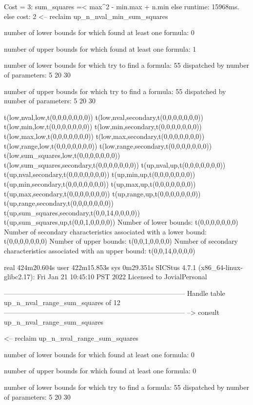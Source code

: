 Cost =  3:  sum_squares =< max^2 - min.max + n.min
else runtime: 15968ms. else cost: 2
<-- reclaim up_n_nval_min_sum_squares

number of lower bounds for which found at least one formula: 0

number of upper bounds for which found at least one formula: 1

number of lower bounds for which try to find a formula: 55
dispatched by number of parameters: 5  20  30

number of upper bounds for which try to find a formula: 55
dispatched by number of parameters: 5  20  30

t(low,nval,low,t(0,0,0,0,0,0,0))
t(low,nval,secondary,t(0,0,0,0,0,0,0))
t(low,min,low,t(0,0,0,0,0,0,0))
t(low,min,secondary,t(0,0,0,0,0,0,0))
t(low,max,low,t(0,0,0,0,0,0,0))
t(low,max,secondary,t(0,0,0,0,0,0,0))
t(low,range,low,t(0,0,0,0,0,0,0))
t(low,range,secondary,t(0,0,0,0,0,0,0))
t(low,sum_squares,low,t(0,0,0,0,0,0,0))
t(low,sum_squares,secondary,t(0,0,0,0,0,0,0))
t(up,nval,up,t(0,0,0,0,0,0,0))
t(up,nval,secondary,t(0,0,0,0,0,0,0))
t(up,min,up,t(0,0,0,0,0,0,0))
t(up,min,secondary,t(0,0,0,0,0,0,0))
t(up,max,up,t(0,0,0,0,0,0,0))
t(up,max,secondary,t(0,0,0,0,0,0,0))
t(up,range,up,t(0,0,0,0,0,0,0))
t(up,range,secondary,t(0,0,0,0,0,0,0))
t(up,sum_squares,secondary,t(0,0,14,0,0,0,0))
t(up,sum_squares,up,t(0,0,1,0,0,0,0))
Number of lower bounds:                                             t(0,0,0,0,0,0,0)
Number of secondary characteristics associated with a lower bound:  t(0,0,0,0,0,0,0)
Number of upper bounds:                                             t(0,0,1,0,0,0,0)
Number of secondary characteristics associated with an upper bound: t(0,0,14,0,0,0,0)

real	424m20.604s
user	422m15.853s
sys	0m29.351s
SICStus 4.7.1 (x86_64-linux-glibc2.17): Fri Jan 21 10:45:10 PST 2022
Licensed to JovialPersonal


--------------------------------------------------------------------------------
Handle table up_n_nval_range_sum_squares of 12
--------------------------------------------------------------------------------
--> consult up_n_nval_range_sum_squares

<-- reclaim up_n_nval_range_sum_squares

number of lower bounds for which found at least one formula: 0

number of upper bounds for which found at least one formula: 0

number of lower bounds for which try to find a formula: 55
dispatched by number of parameters: 5  20  30

